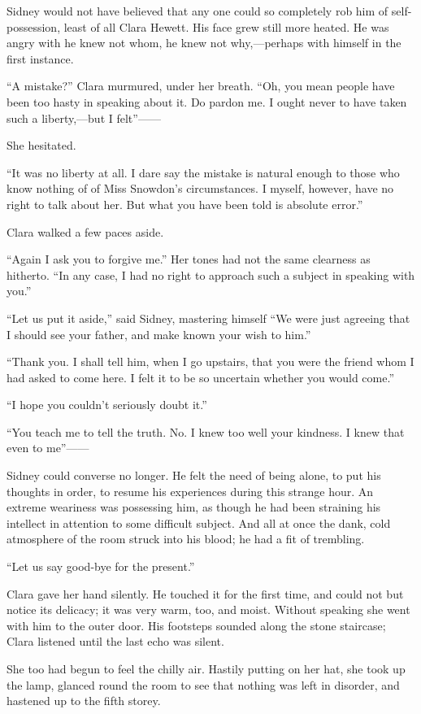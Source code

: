 Sidney would not have believed that any one could so completely rob him
of self-possession, least of all Clara Hewett. His face grew still more
heated. He was angry with he knew not whom, he knew not why,---perhaps
with himself in the first instance.

``A mistake?'' Clara murmured, under her breath. ``Oh, you mean people
have been too hasty in speaking about it. Do pardon me. {}I ought never
to have taken such a liberty,---but I felt''{{------}}

She hesitated.

``It was no liberty at all. I dare say the mistake is natural enough to
those who know nothing of of Miss Snowdon's circumstances. I myself,
however, have no right to talk about her. But what you have been told is
absolute error.''

Clara walked a few paces aside.

``Again I ask you to forgive me.'' Her tones had not the same clearness
as hitherto. ``In any case, I had no right to approach such a subject in
speaking with you.''

``Let us put it aside,'' said Sidney, mastering himself ``We were just
agreeing that I should see your father, and make known your wish to
him.''

``Thank you. I shall tell him, when I go upstairs, that you were the
friend whom I had asked to come here. I felt it to be so uncertain
whether you would come.''

``I hope you couldn't seriously doubt it.''

``You teach me to tell the truth. No. I knew too well your kindness. I
knew that even to me''{{------}}

{}Sidney could converse no longer. He felt the need of being alone, to
put his thoughts in order, to resume his experiences during this strange
hour. An extreme weariness was possessing him, as though he had been
straining his intellect in attention to some difficult subject. And all
at once the dank, cold atmosphere of the room struck into his blood; he
had a fit of trembling.

``Let us say good-bye for the present.''

Clara gave her hand silently. He touched it for the first time, and
could not but notice its delicacy; it was very warm, too, and moist.
Without speaking she went with him to the outer door. His footsteps
sounded along the stone staircase; Clara listened until the last echo
was silent.

She too had begun to feel the chilly air. Hastily putting on her hat,
she took up the lamp, glanced round the room to see that nothing was
left in disorder, and hastened up to the fifth storey.

